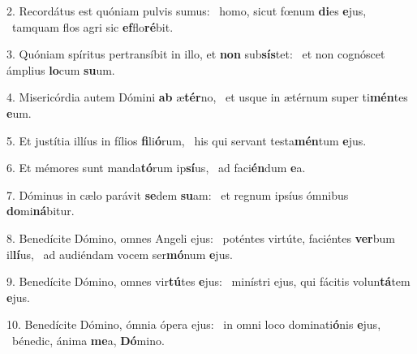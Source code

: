 2. Recordátus est quóniam pulvis sumus: \dag\  homo, sicut fœnum \textbf{di}es \textbf{e}jus, \ast\  tamquam flos agri sic \textbf{ef}flo\textbf{ré}bit.\

3. Quóniam spíritus pertransíbit in illo, et \textbf{non} sub\textbf{sís}tet: \ast\  et non cognóscet ámplius \textbf{lo}cum \textbf{su}um.\

4. Misericórdia autem Dómini \textbf{ab} æ\textbf{tér}no, \ast\  et usque in ætérnum super ti\textbf{mén}tes \textbf{e}um.\

5. Et justítia illíus in fílios \textbf{fi}li\textbf{ó}rum, \ast\  his qui servant testa\textbf{mén}tum \textbf{e}jus.\

6. Et mémores sunt manda\textbf{tó}rum ip\textbf{sí}us, \ast\  ad faci\textbf{én}dum \textbf{e}a.\

7. Dóminus in cælo parávit \textbf{se}dem \textbf{su}am: \ast\  et regnum ipsíus ómnibus \textbf{do}mi\textbf{ná}bitur.\

8. Benedícite Dómino, omnes Angeli ejus: \dag\  poténtes virtúte, faciéntes \textbf{ver}bum il\textbf{lí}us, \ast\  ad audiéndam vocem ser\textbf{mó}num \textbf{e}jus.\

9. Benedícite Dómino, omnes vir\textbf{tú}tes \textbf{e}jus: \ast\  minístri ejus, qui fácitis volun\textbf{tá}tem \textbf{e}jus.\

10. Benedícite Dómino, ómnia ópera ejus: \dag\  in omni loco dominati\textbf{ó}nis \textbf{e}jus, \ast\  bénedic, ánima \textbf{me}a, \textbf{Dó}mino.\

